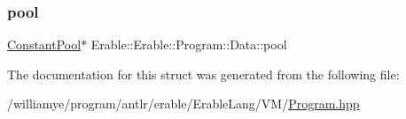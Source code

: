 \subsubsection{\texorpdfstring{pool}{pool}}
{\footnotesize\ttfamily \mbox{\hyperlink{class_erable_1_1_constant_pool}{Constant\+Pool}}$\ast$ Erable\+::\+Erable\+::\+Program\+::\+Data\+::pool}



The documentation for this struct was generated from the following file\+:\begin{DoxyCompactItemize}
\item 
/williamye/program/antlr/erable/\+Erable\+Lang/\+V\+M/\mbox{\hyperlink{_program_8hpp}{Program.\+hpp}}\end{DoxyCompactItemize}
